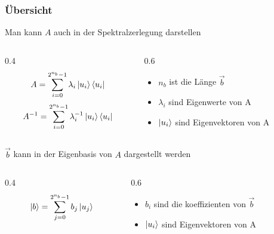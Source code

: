     \begin{frame}
    \frametitle{Übersicht}

        \hfil

        Man kann $A$ auch in der Spektralzerlegung darstellen

        \begin{columns}[c]
            \begin{column}{0.4\hsize}\centering
            $$A = \sum_{i=0}^{2^{n_b}-1} \lambda_i \ket{u_i}\bra{u_i}$$
            $$A^{-1} = \sum_{i=0}^{2^{n_b}-1} \lambda_i^{-1} \ket{u_i}\bra{u_i}$$
            \end{column}

            \begin{column}{0.6\hsize}
            \begin{itemize}
            \item   $n_b$ ist die Länge $\vec{b}$ 
            \item   $\lambda_i$ sind Eigenwerte von A
            \item   $\ket{u_i}$ sind Eigenvektoren von A
            \end{itemize}
 
            \end{column}
        \end{columns}

        \hfil

        \hfil

        $\vec{b}$ kann in der Eigenbasis von $A$ dargestellt werden 

        \begin{columns}[c]
            \begin{column}{0.4\hsize}\centering
            $$\ket{b} = \sum_{j=0}^{2^{n_b}-1} b_j\ket{u_j}$$
            \end{column}
            \begin{column}{0.6\hsize}
            \begin{itemize}
            \item   $b_i$ sind die koeffizienten von $\vec{b}$
            \item   $\ket{u_i}$ sind Eigenvektoren von A
            \end{itemize}
 
            \end{column}
        \end{columns}



   \end{frame}

